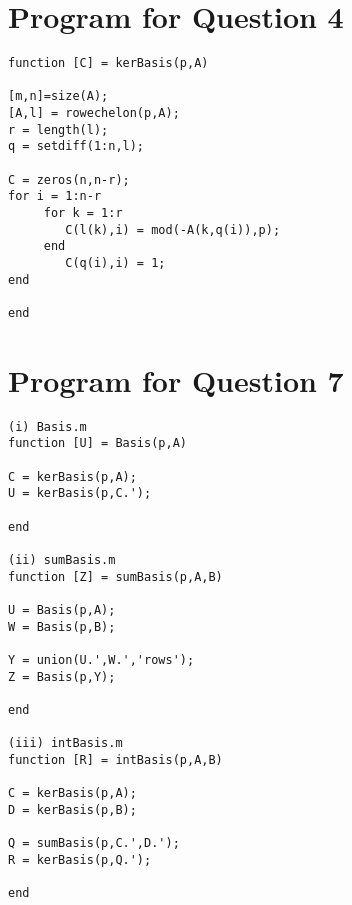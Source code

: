 \documentclass[11pt]{article}
\begin{document}
\newpage
\section*{Program for Question 4}
\label{sec:program4}
\begin{verbatim}
function [C] = kerBasis(p,A)

[m,n]=size(A);
[A,l] = rowechelon(p,A);
r = length(l);
q = setdiff(1:n,l);
   
C = zeros(n,n-r);   
for i = 1:n-r    
     for k = 1:r
        C(l(k),i) = mod(-A(k,q(i)),p);    
     end
        C(q(i),i) = 1;
end  

end
\end{verbatim}









\newpage
\section*{Program for Question 7}
\label{sec:program7}
\begin{verbatim}
(i) Basis.m
function [U] = Basis(p,A)

C = kerBasis(p,A);
U = kerBasis(p,C.');

end

(ii) sumBasis.m
function [Z] = sumBasis(p,A,B)

U = Basis(p,A);
W = Basis(p,B);

Y = union(U.',W.','rows');
Z = Basis(p,Y);

end

(iii) intBasis.m
function [R] = intBasis(p,A,B)

C = kerBasis(p,A);
D = kerBasis(p,B);

Q = sumBasis(p,C.',D.');
R = kerBasis(p,Q.');

end
\end{verbatim}
\end{document}
